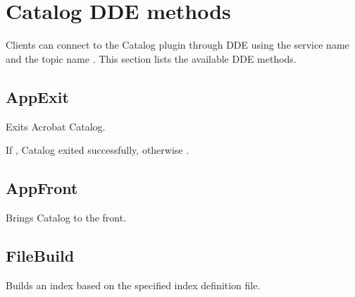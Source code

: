 \documentclass[letterpaper,12pt,english,openany,oneside]{sphinxmanual}
\begin{document}
\section{Catalog DDE methods}
\label{\detokenize{IAC_API_CatalogCatIntro:catalog-dde-methods}}
Clients can connect to the Catalog plug\sphinxhyphen{}in through DDE using the service name  and the topic name . This section lists the available DDE methods.


\subsection{AppExit}
\label{\detokenize{IAC_API_CatalogCatIntro:appexit}}
Exits Acrobat Catalog.


\begin{sphinxVerbatim}[commandchars=\\\{\}]
\PYG{p}{[}\PYG{p}{]}
\end{sphinxVerbatim}


If , Catalog exited successfully, otherwise .


\subsection{AppFront}
\label{\detokenize{IAC_API_CatalogCatIntro:appfront}}
Brings Catalog to the front.


\begin{sphinxVerbatim}[commandchars=\\\{\}]
\PYG{p}{[}\PYG{p}{]}
\end{sphinxVerbatim}


\subsection{FileBuild}
\label{\detokenize{IAC_API_CatalogCatIntro:filebuild}}
Builds an index based on the specified index definition file.


\begin{sphinxVerbatim}[commandchars=\\\{\}]
\PYG{p}{[} \PYG{p}{]}
\end{sphinxVerbatim}
\end{document}
